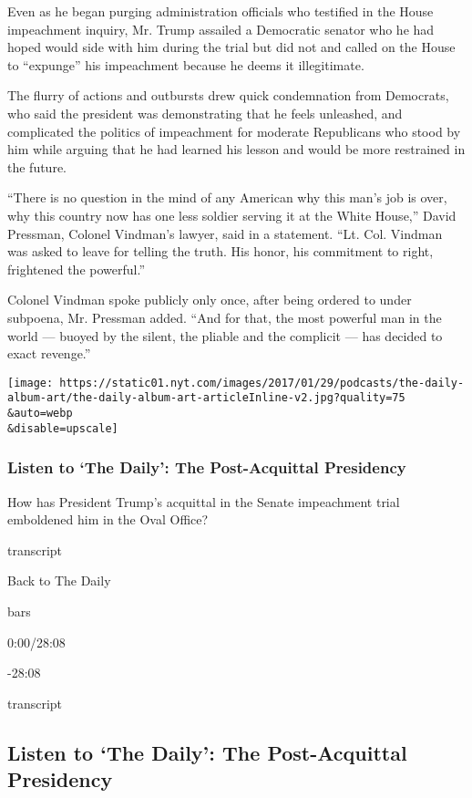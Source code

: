 Even as he began purging administration officials who testified in the
House impeachment inquiry, Mr. Trump assailed a Democratic senator who
he had hoped would side with him during the trial but did not and called
on the House to ``expunge'' his impeachment because he deems it
illegitimate.

The flurry of actions and outbursts drew quick condemnation from
Democrats, who said the president was demonstrating that he feels
unleashed, and complicated the politics of impeachment for moderate
Republicans who stood by him while arguing that he had learned his
lesson and would be more restrained in the future.

``There is no question in the mind of any American why this man's job is
over, why this country now has one less soldier serving it at the White
House,'' David Pressman, Colonel Vindman's lawyer, said in a statement.
``Lt. Col. Vindman was asked to leave for telling the truth. His honor,
his commitment to right, frightened the powerful.''

Colonel Vindman spoke publicly only once, after being ordered to under
subpoena, Mr. Pressman added. ``And for that, the most powerful man in
the world --- buoyed by the silent, the pliable and the complicit ---
has decided to exact revenge.''

\texttt{[image: https://static01.nyt.com/images/2017/01/29/podcasts/the-daily-album-art/the-daily-album-art-articleInline-v2.jpg?quality=75\\\&auto=webp\\\&disable=upscale]}

\hypertarget{listen-to-the-daily-the-post-acquittal-presidency}{%
\subsubsection{Listen to `The Daily': The Post-Acquittal
Presidency}\label{listen-to-the-daily-the-post-acquittal-presidency}}

How has President Trump's acquittal in the Senate impeachment trial
emboldened him in the Oval Office?

transcript

Back to The Daily

bars

0:00/28:08

-28:08

transcript

\hypertarget{listen-to-the-daily-the-post-acquittal-presidency-1}{%
\subsection{Listen to `The Daily': The Post-Acquittal
Presidency}\label{listen-to-the-daily-the-post-acquittal-presidency-1}}

